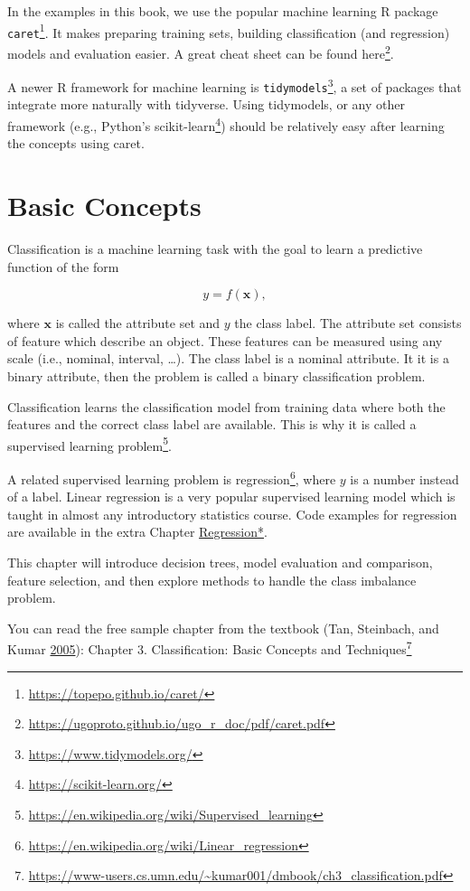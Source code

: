\documentclass[
  notitlepage]{book}
\DeclareRobustCommand{\href}[2]{#2\footnote{\url{#1}}}
\begin{document}
In the examples in this book, we use the popular machine learning R package \href{https://topepo.github.io/caret/}{\texttt{caret}}. It makes preparing
training sets, building classification (and regression) models and
evaluation easier. A great cheat sheet can be found
\href{https://ugoproto.github.io/ugo_r_doc/pdf/caret.pdf}{here}.

A newer R framework for machine learning
is \href{https://www.tidymodels.org/}{\texttt{tidymodels}}, a set of packages that
integrate more naturally with tidyverse. Using tidymodels, or any other
framework (e.g., Python's \href{https://scikit-learn.org/}{scikit-learn}) should
be relatively easy after
learning the concepts using caret.

\hypertarget{basic-concepts}{%
\section{Basic Concepts}\label{basic-concepts}}

Classification is a machine learning task with the goal to learn a predictive
function of the form

\[y = f(\mathbf{x}),\]

where \(\mathbf{x}\) is called the attribute set and \(y\) the class label. The attribute set
consists of feature which describe an object. These features can be measured using any scale
(i.e., nominal, interval, \ldots). The class label is a nominal attribute. It it is a binary
attribute, then the problem is called a binary classification problem.

Classification learns the classification model from training data where both the features and
the correct class label are available. This is why it is called a \href{https://en.wikipedia.org/wiki/Supervised_learning}{supervised learning problem}.

A related supervised learning problem is \href{https://en.wikipedia.org/wiki/Linear_regression}{regression},
where \(y\) is a number instead of a label.
Linear regression is a very popular supervised learning model
which is taught in almost any introductory statistics course.
Code examples for regression are available in the extra Chapter
\protect\hyperlink{regression}{Regression*}.

This chapter will introduce decision trees, model evaluation and comparison, feature selection,
and then explore methods to handle the class imbalance problem.

You can read the free sample chapter from the textbook (Tan, Steinbach, and Kumar \protect\hyperlink{ref-Tan2005}{2005}):
\href{https://www-users.cs.umn.edu/~kumar001/dmbook/ch3_classification.pdf}{Chapter 3. Classification: Basic Concepts and
Techniques}
\end{document}
